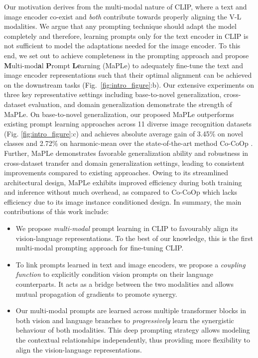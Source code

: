 \documentclass[10pt,twocolumn,letterpaper]{article}
\begin{document}
Our motivation derives from the multi-modal nature of CLIP, where a text and image encoder co-exist and \emph{both} contribute towards properly aligning the V-L modalities. {We argue that any prompting technique should adapt the model completely and} therefore, learning prompts only for the text encoder in CLIP is not sufficient to model the adaptations needed for the image encoder. {To this end, we set out to achieve completeness in the prompting approach and} propose \textbf{M}ulti-mod\textbf{a}l \textbf{P}rompt \textbf{Le}arning (MaPLe) to adequately fine-tune the text and image encoder representations such that their optimal alignment can be achieved on the downstream tasks (Fig.~\ref{fig:intro_figure}:b). Our extensive experiments on three key representative settings including base-to-novel generalization,  cross-dataset evaluation, and domain generalization demonstrate the strength of MaPLe. {On base-to-novel generalization, our proposed MaPLe outperforms existing prompt learning approaches across 11 diverse image recognition datasets (Fig. \ref{fig:intro_figure}:c) and achieves absolute average gain of 3.45\% on novel classes and 2.72\% on harmonic-mean over the state-of-the-art method Co-CoOp \cite{zhou2022conditional}. Further, MaPLe demonstrates favorable generalization ability and robustness in cross-dataset transfer and domain generalization settings, leading to consistent improvements compared to existing approaches. Owing to its streamlined architectural design, MaPLe exhibits improved efficiency during both training and inference without much overhead, as compared to Co-CoOp which lacks efficiency due to its image instance conditioned design.} In summary, the main contributions of this work include: \vspace{-0.5em}
\begin{itemize}\setlength{\itemsep}{0em}
\item We propose \emph{multi-modal} prompt learning in CLIP to favourably align its vision-language representations. To the best of our knowledge, this is the first multi-modal prompting approach for fine-tuning CLIP.
\item To link prompts learned in text and image encoders, we propose a \emph{coupling function} to explicitly condition vision prompts on their language counterparts. It acts as a bridge between the two modalities and allows mutual propagation of gradients to promote synergy.
\item Our multi-modal prompts are learned across multiple transformer blocks in both vision and language branches to \emph{progressively} learn the synergistic behaviour of both modalities. This deep prompting strategy allows modeling the contextual relationships independently, thus providing more flexibility to align the vision-language representations. 
\end{itemize}
\end{document}
